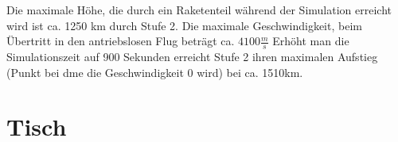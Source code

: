 \documentclass[10pt]{scrartcl}
\begin{document}
	Die maximale Höhe, die durch ein Raketenteil während der Simulation erreicht wird ist ca. 1250 km durch Stufe 2. Die maximale Geschwindigkeit, beim Übertritt in den antriebslosen Flug beträgt ca. $4100 \frac{m}{s}$
	Erhöht man die Simulationszeit auf 900 Sekunden erreicht Stufe 2 ihren maximalen Aufstieg (Punkt bei dme die Geschwindigkeit 0 wird) bei ca. 1510km.
	
	
\section{Tisch}	
		
\end{document}
